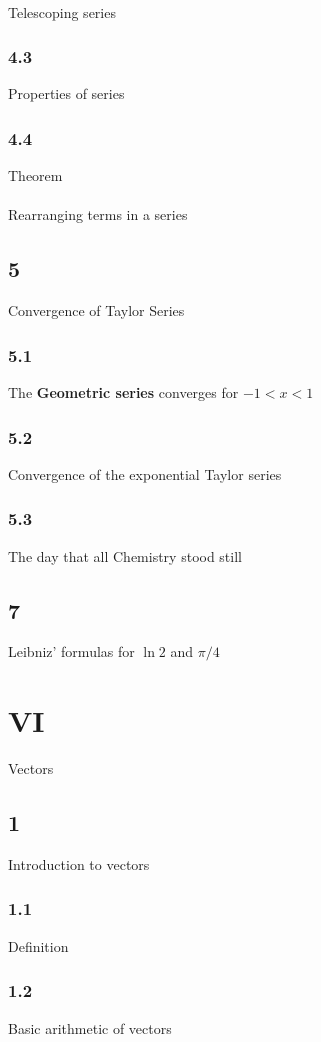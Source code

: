 \subsubsection{}{Telescoping series}
\subsection{4.3}{Properties of series}
\subsection{4.4}{Theorem}
\subsubsection{}{Rearranging terms in a series}
\section{5}{Convergence of Taylor Series}
\subsection{5.1}{The {\bf Geometric series} converges for $-1<x<1$}
\subsection{5.2}{Convergence of the exponential Taylor series}
\subsection{5.3}{The day that all Chemistry stood still}

\section{7}{Leibniz' formulas for $\ln 2$ and $\pi /4$}

\chapter{VI}{Vectors}
\section{1}{Introduction to vectors}
\subsection{1.1}{Definition}
\subsection{1.2}{Basic arithmetic of vectors}
